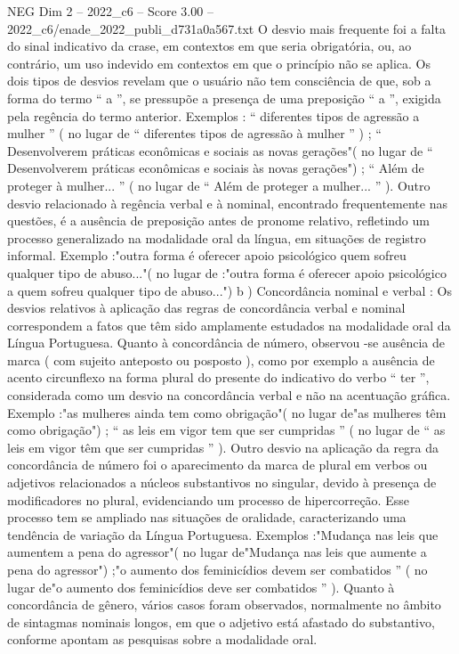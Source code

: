 \begin{textsample}{NEG Dim 2 – 2022\_c6 – Score 3.00 – 2022\_c6/enade\_2022\_publi\_d731a0a567.txt}
O desvio mais frequente foi a falta do sinal indicativo da crase, em contextos em que seria obrigatória, ou, ao contrário, um uso indevido em contextos em que o princípio não se aplica.
Os dois tipos de desvios revelam que o usuário não tem consciência de que, sob a forma do termo “ a ”, se pressupõe a presença de uma preposição “ a ”, exigida pela regência do termo anterior.
Exemplos : “ diferentes tipos de agressão a mulher ” ( no lugar de “ diferentes tipos de agressão à mulher ” ) ; “ Desenvolverem práticas econômicas e sociais as novas gerações"( no lugar de “ Desenvolverem práticas econômicas e sociais às novas gerações") ; “ Além de proteger à mulher... ” ( no lugar de “ Além de proteger a mulher... ” ).
Outro desvio relacionado à regência verbal e à nominal, encontrado frequentemente nas questões, é a ausência de preposição antes de pronome relativo, refletindo um processo generalizado na modalidade oral da língua, em situações de registro informal.
Exemplo :"outra forma é oferecer apoio psicológico quem sofreu qualquer tipo de abuso..."( no lugar de :"outra forma é oferecer apoio psicológico a quem sofreu qualquer tipo de abuso...") b ) Concordância nominal e verbal : Os desvios relativos à aplicação das regras de concordância verbal e nominal correspondem a fatos que têm sido amplamente estudados na modalidade oral da Língua Portuguesa.
Quanto à concordância de número, observou -se ausência de marca ( com sujeito anteposto ou posposto ), como por exemplo a ausência de acento circunflexo na forma plural do presente do indicativo do verbo “ ter ”, considerada como um desvio na concordância verbal e não na acentuação gráfica.
Exemplo :"as mulheres ainda tem como obrigação"( no lugar de"as mulheres têm como obrigação") ; “ as leis em vigor tem que ser cumpridas ” ( no lugar de “ as leis em vigor têm que ser cumpridas ” ).
Outro desvio na aplicação da regra da concordância de número foi o aparecimento da marca de plural em verbos ou adjetivos relacionados a núcleos substantivos no singular, devido à presença de modificadores no plural, evidenciando um processo de hipercorreção.
Esse processo tem se ampliado nas situações de oralidade, caracterizando uma tendência de variação da Língua Portuguesa.
Exemplos :"Mudança nas leis que aumentem a pena do agressor"( no lugar de"Mudança nas leis que aumente a pena do agressor") ;"o aumento dos feminicídios devem ser combatidos ” ( no lugar de"o aumento dos feminicídios deve ser combatidos ” ).
Quanto à concordância de gênero, vários casos foram observados, normalmente no âmbito de sintagmas nominais longos, em que o adjetivo está afastado do substantivo, conforme apontam as pesquisas sobre a modalidade oral.

\end{textsample}
